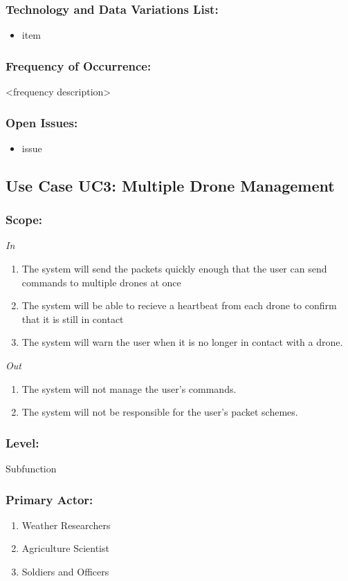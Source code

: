 \documentclass[ProductRequirements.tex]{subfiles}
\begin{document}
	\subsubsection*{Technology and Data Variations List:}
	\begin{itemize}\itemsep1pt
		\item item
	\end{itemize}
	\subsubsection*{Frequency of Occurrence:}
	<frequency description>
	\subsubsection*{Open Issues:}
	\begin{itemize}\itemsep1pt
		\item issue
	\end{itemize}		
	
	\subsection{Use Case UC3: Multiple Drone Management}
	\subsubsection*{Scope:}
	\textit{In}
	\begin{enumerate}
		\item The system will send the packets quickly enough that the user can send commands to multiple drones at once
		\item The system will be able to recieve a heartbeat from each drone to confirm that it is still in contact
		\item The system will warn the user when it is no longer in contact with a drone.
	\end{enumerate}
	\textit{Out}
	\begin{enumerate}
		\item The system will not manage the user's commands.
		\item The system will not be responsible for the user's packet schemes.
	\end{enumerate}
	\subsubsection*{Level:}
	Subfunction
	\subsubsection*{Primary Actor:}
	\begin{enumerate}
		\item Weather Researchers
		\item Agriculture Scientist
		\item Soldiers and Officers
	\end{enumerate}
\end{document}
